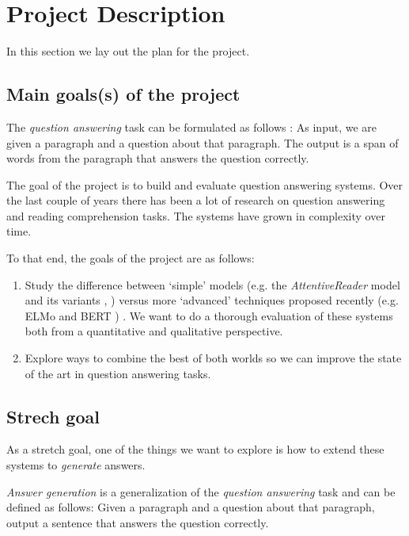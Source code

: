\section{Project Description}
\label{sec:projectdescription}

In this section we lay out the plan for the project.

\subsection{Main goals(s) of the project}
\label{subsec:projectgoals}

The \textit{question answering} task can be formulated as follows : As input, we are given a paragraph and a question about that paragraph. The output is a span of words from the paragraph that answers the question correctly.

The goal of the project is to build and evaluate question answering systems.  Over the last couple of years there has been a lot of research on question answering and reading comprehension tasks. The systems have grown in complexity over time.

To that end, the goals of the project are as follows:

\begin{enumerate}

\item Study the difference between `simple' models (e.g. the \textit{AttentiveReader} model \cite{hermann2015teaching} and its variants  \cite{chen2016thorough}, \cite{chen2017reading}) versus more `advanced' techniques proposed recently (e.g. ELMo \cite{peters2018deep} and BERT \cite{devlin2018bert}) . We want to do a thorough evaluation of these systems both from a quantitative and qualitative perspective.

\item Explore ways to combine the best of both worlds so we can improve the state of the art in question answering tasks.

\end{enumerate}

\subsection{Strech goal}
\label{subsec:projectstrechgoals}

As a stretch goal, one of the things we want to explore is how to extend these systems to \textit{generate} answers. 

\textit{Answer generation} is a generalization of the \textit{question answering} task and can be defined as follows: Given a paragraph and a question about that paragraph, output a sentence that answers the question correctly. 

